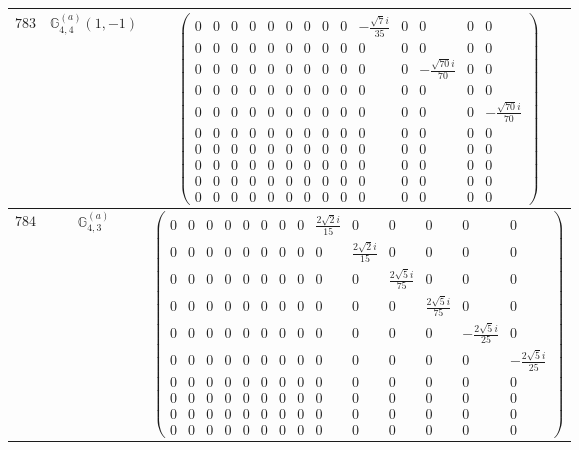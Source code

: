 \documentclass[fleqn,8pt,landscape]{jsarticle}
\begin{document}
\begin{center}
\begin{longtable}{ccc}
$ 783 $ & $ \mathbb{G}_{4,4}^{(a)}(1,-1) $ & $ \begin{pmatrix} 0 & 0 & 0 & 0 & 0 & 0 & 0 & 0 & 0 & - \frac{\sqrt{7} i}{35} & 0 & 0 & 0 & 0 \\ 0 & 0 & 0 & 0 & 0 & 0 & 0 & 0 & 0 & 0 & 0 & 0 & 0 & 0 \\ 0 & 0 & 0 & 0 & 0 & 0 & 0 & 0 & 0 & 0 & 0 & - \frac{\sqrt{70} i}{70} & 0 & 0 \\ 0 & 0 & 0 & 0 & 0 & 0 & 0 & 0 & 0 & 0 & 0 & 0 & 0 & 0 \\ 0 & 0 & 0 & 0 & 0 & 0 & 0 & 0 & 0 & 0 & 0 & 0 & 0 & - \frac{\sqrt{70} i}{70} \\ 0 & 0 & 0 & 0 & 0 & 0 & 0 & 0 & 0 & 0 & 0 & 0 & 0 & 0 \\ 0 & 0 & 0 & 0 & 0 & 0 & 0 & 0 & 0 & 0 & 0 & 0 & 0 & 0 \\ 0 & 0 & 0 & 0 & 0 & 0 & 0 & 0 & 0 & 0 & 0 & 0 & 0 & 0 \\ 0 & 0 & 0 & 0 & 0 & 0 & 0 & 0 & 0 & 0 & 0 & 0 & 0 & 0 \\ 0 & 0 & 0 & 0 & 0 & 0 & 0 & 0 & 0 & 0 & 0 & 0 & 0 & 0 \end{pmatrix} $ \\ \hline
$ 784 $ & $ \mathbb{G}_{4,3}^{(a)} $ & $ \begin{pmatrix} 0 & 0 & 0 & 0 & 0 & 0 & 0 & 0 & \frac{2 \sqrt{2} i}{15} & 0 & 0 & 0 & 0 & 0 \\ 0 & 0 & 0 & 0 & 0 & 0 & 0 & 0 & 0 & \frac{2 \sqrt{2} i}{15} & 0 & 0 & 0 & 0 \\ 0 & 0 & 0 & 0 & 0 & 0 & 0 & 0 & 0 & 0 & \frac{2 \sqrt{5} i}{75} & 0 & 0 & 0 \\ 0 & 0 & 0 & 0 & 0 & 0 & 0 & 0 & 0 & 0 & 0 & \frac{2 \sqrt{5} i}{75} & 0 & 0 \\ 0 & 0 & 0 & 0 & 0 & 0 & 0 & 0 & 0 & 0 & 0 & 0 & - \frac{2 \sqrt{5} i}{25} & 0 \\ 0 & 0 & 0 & 0 & 0 & 0 & 0 & 0 & 0 & 0 & 0 & 0 & 0 & - \frac{2 \sqrt{5} i}{25} \\ 0 & 0 & 0 & 0 & 0 & 0 & 0 & 0 & 0 & 0 & 0 & 0 & 0 & 0 \\ 0 & 0 & 0 & 0 & 0 & 0 & 0 & 0 & 0 & 0 & 0 & 0 & 0 & 0 \\ 0 & 0 & 0 & 0 & 0 & 0 & 0 & 0 & 0 & 0 & 0 & 0 & 0 & 0 \\ 0 & 0 & 0 & 0 & 0 & 0 & 0 & 0 & 0 & 0 & 0 & 0 & 0 & 0 \end{pmatrix} $ \\ \hline

\end{longtable}
\end{center}
\end{document}
